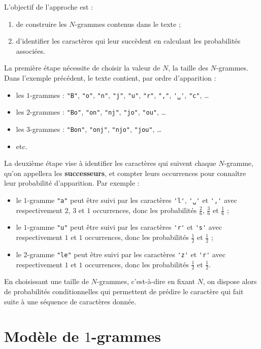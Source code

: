 \documentclass[10pt]{article}
\begin{document}
L'objectif de l'approche est :
\begin{enumerate}
\item de construire les $N$-grammes contenus dans le texte ;
\item d'identifier les caractères qui leur succèdent en calculant les probabilités associées.
\end{enumerate}

La première étape nécessite de choisir la valeur de $N$, la taille des $N$-grammes. Dans l'exemple précédent, le texte contient, par ordre d'apparition :
\begin{itemize}
\item les $1$-grammes : \verb|"B"|, \verb|"o"|, \verb|"n"|, \verb|"j"|, \verb|"u"|, \verb|"r"|, \verb|","|, \verb|'␣'|, \verb|"c"|, …
\item les $2$-grammes : \verb|"Bo"|, \verb|"on"|, \verb|"nj"|, \verb|"jo"|, \verb|"ou"|, …
\item les $3$-grammes : \verb|"Bon"|, \verb|"onj"|, \verb|"njo"|, \verb|"jou"|, …
\item etc.
\end{itemize}

La deuxième étape vise à identifier les caractères qui suivent chaque $N$-gramme, qu'on appellera les \textbf{successeurs}, et compter leurs occurrences pour connaître leur probabilité d'apparition. Par exemple :
\begin{itemize}
\item le $1$-gramme \verb|"a"| peut être suivi par les caractères \verb|'l'|, \verb|'␣'| et \verb|','| avec respectivement $2$, $3$ et $1$ occurrences, donc les probabilités $\frac{2}{6}$, $\frac{3}{6}$ et $\frac{1}{6}$ ;
\item le $1$-gramme \verb|"u"| peut être suivi par les caractères \verb|'r'| et \verb|'s'| avec respectivement $1$ et $1$ occurrences, donc les probabilités $\frac{1}{2}$ et $\frac{1}{2}$ ;
\item le $2$-gramme \verb|"le"| peut être suivi par les caractères \verb|'z'| et \verb|'r'| avec respectivement $1$ et $1$ occurrences, donc les probabilités $\frac{1}{2}$ et $\frac{1}{2}$.
\end{itemize}

En choisissant une taille de $N$-grammes, c'est-à-dire en fixant $N$, on dispose alors de probabilités conditionnelles qui permettent de prédire le caractère qui fait suite à une séquence de caractères donnée.

\section{Modèle de $1$-grammes}
\end{document}
